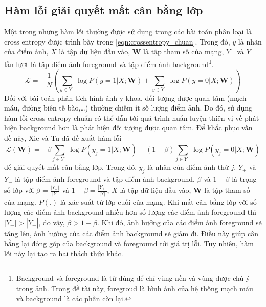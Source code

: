 \subsection{Hàm lỗi giải quyết mất cân bằng lớp}
\label{subsec:ham_loi_giai_quyet_mat_can_bang_lop}
	Một trong những hàm lỗi thường được sử dụng trong các bài toán phân loại là cross entropy được trình bày trong \autoref{eqn:crossentropy_chuan}. Trong đó, $y$ là nhãn của điểm ảnh, $X$ là tập dữ liệu đầu vào, $\mathbf{W}$ là tập tham số của mạng, $Y_+$ và $Y_-$ lần lượt là tập điểm ảnh foreground và tập điểm ảnh background\footnote{Background và foreground là từ dùng để chỉ vùng nền và vùng được chú ý trong ảnh. Trong đề tài này, foregroud là hình ảnh của hệ thống mạch máu và background là các phần còn lại.}. 
	\begin{equation}
		\label{eqn:crossentropy_chuan}
		\mathcal{L} = -\frac{1}{N}\left(\sum_{y\in Y_+}\log P(y = 1|X; \mathbf{W}) + \sum_{y\in Y_-} \log P(y = 0|X; \mathbf{W})\right)
	\end{equation}
	Đối với bài toán phân tích hình ảnh y khoa, đối tượng được quan tâm (mạch máu, đường biên tế bào,\ldots) thường chiếm ít số lượng điểm ảnh. Do đó, sử dụng hàm lỗi cross entropy chuẩn có thể dẫn tới quá trình huấn luyện thiên vị về phát hiện background hơn là phát hiện đối tượng được quan tâm. Để khắc phục vấn đề này, Xie và Tu \cite{xie2015holistically} đã đề xuất hàm lỗi 
	\begin{equation}
		\label{eqn:crossentropy_can_bang_lop}
		\mathcal{L}(\mathbf{W}) = -\beta\sum_{j\in Y_+}\log P(y_j = 1|X; \mathbf{W}) - (1 - \beta) \sum_{j\in Y_-}\log P(y_j = 0|X; \mathbf{W})
	\end{equation}
	để giải quyết mất cân bằng lớp. Trong đó, $y_j$ là nhãn của điểm ảnh thứ $j$, $Y_+$ và $Y_-$ là tập điểm ảnh foreground và tập điểm ảnh background, $\beta$ và $1 - \beta$ là trọng số lớp với $\beta = \frac{|Y_-|}{|Y|}$ và $1 - \beta = \frac{|Y_+|}{|Y|}$, $X$ là tập dữ liệu đầu vào, $\mathbf{W}$ là tập tham số của mạng. $P(.)$ là xác suất từ lớp cuối của mạng. Khi mất cân bằng lớp với số lượng các điểm ảnh background nhiều hơn số lượng các điểm ảnh foreground thì $|Y_-| > |Y_+|$, do vậy, $\beta > 1 - \beta$. Khi đó, ảnh hưởng của các điểm ảnh foreground sẽ tăng lên, ảnh hưởng của các điểm ảnh background sẽ giảm đi. Điều này giúp cân bằng lại đóng góp của background và foreground tới giá trị lỗi. Tuy nhiên, hàm lỗi này lại tạo ra hai thách thức khác.
	
